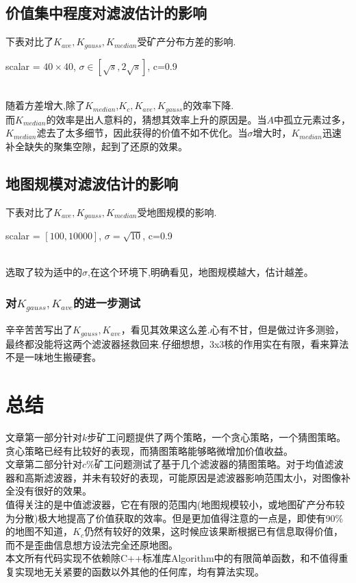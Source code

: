 \documentclass[UTF8]{ctexart}
\begin{document}
\newpage
\subsection{价值集中程度对滤波估计的影响}
下表对比了$K_{ave},K_{gauss},K_{median}$受矿产分布方差的影响.
\begin{table}[h]
    \centering
    \caption{scalar = $40\times 40$, $\sigma \in [\sqrt{s},2\sqrt{s}]$, c=0.9}
\end{table}\\
随着方差增大,除了$K_{median}$,$K_{c},K_{ave}, K_{gauss}$的效率下降.\\
而$K_{median}$的效率是出人意料的，猜想其效率上升的原因是。当$A$中孤立元素过多，$K_{median}$滤去了太多细节，因此获得的价值不如不优化。当$\sigma$增大时，$K_{median}$迅速补全缺失的聚集空隙，起到了还原的效果。
\newpage
\subsection{地图规模对滤波估计的影响}
下表对比了$K_{ave},K_{gauss},K_{median}$受地图规模的影响.
\begin{table}[h]
    \centering
    \caption{scalar = $[100, 10000]$, $\sigma = \sqrt{10}$, c=0.9}
\end{table}\\
选取了较为适中的$\sigma$,在这个环境下,明确看见，地图规模越大，估计越差。
\subsubsection{对$K_{gauss},K_{ave}$的进一步测试}
辛辛苦苦写出了$K_{gauss},K_{ave}$，看见其效果这么差.心有不甘，但是做过许多测验，最终都没能将这两个滤波器拯救回来.仔细想想，3x3核的作用实在有限，看来算法不是一味地生搬硬套。
\section{总结}
文章第一部分针对$k$步矿工问题提供了两个策略，一个贪心策略，一个猜图策略。贪心策略已经有比较好的表现，而猜图策略能够略微增加价值收益。\\
\indent 文章第二部分针对$c\%$矿工问题测试了基于几个滤波器的猜图策略。对于均值滤波器和高斯滤波器，并未有较好的表现，可能原因是滤波器影响范围太小，对图像补全没有很好的效果。\\
\indent 值得关注的是中值滤波器，它在有限的范围内(地图规模较小，或地图矿产分布较为分散)极大地提高了价值获取的效率。但是更加值得注意的一点是，即使有90\%的地图不知道，$K_c$仍然有较好的效果，这时候应该果断根据已有信息取得价值，而不是歪曲信息想方设法完全还原地图。\\
\indent 本文所有代码实现不依赖除C++标准库Algorithm中的有限简单函数，和不值得重复实现地无关紧要的函数以外其他的任何库，均有算法实现。
\end{document}
